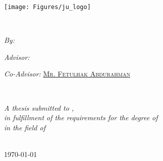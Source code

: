 \documentclass[
12pt, %
oneside, %
english, %
onehalfspacing, %
nolistspacing, %
liststotoc, %
parskip, %
headsepline, %
consistentlayout, %
]{MastersDoctoralThesis} %
\author{\textsc{Eyob Sisay}} %
\institute{\href{https://www.ju.edu.et/jit/}{Jimma Institute of Technology}} %
\begin{document}
\frontmatter %

\pagestyle{plain} %


\begin{titlepage}
\begin{center}

\texttt{[image: Figures/ju\_logo]} 

\vfill
{\scshape\LARGE {\univname}\par}\vspace{0.2cm} 
{\scshape\LARGE {\institutename}\par}\vspace{0.5cm}
\textsc{\Large \deptname}\\[0.6cm] 

\vspace{0.4cm} 
{\Large \bfseries \ttitle\par}\vspace{0.5cm} %
 
\vfill
\begin{minipage}[t]{0.7\textwidth}
\begin{center}\large
\emph{By: }\hspace{1.5em}
\href{https://sites.google.com/view/eysi}{\authorname } %

\emph{Advisor: } \hspace{0.3em}
\href{http://www.aait.edu.et/professor/dr-getachew-alemu}{\supname }

\emph{Co-Advisor: } \hspace{0.2em}
\href{https://www.researchgate.net/profile/Fetulhak_Abdurahman}{\textsc{Mr. Fetulhak Abdurahman }}
\end{center}
\end{minipage}\\[1cm]
 
\vfill

\large \textit{A thesis submitted to \deptname , \univname\\ in fulfillment of the requirements for the degree of \degreename}\\[0.3cm] %
\textit{in the field of}\\[0.3cm]
\groupname\\[1cm] %

\vfill

{\large \today} %

\addressname %
 
\end{center}
\end{titlepage}
\end{document}
